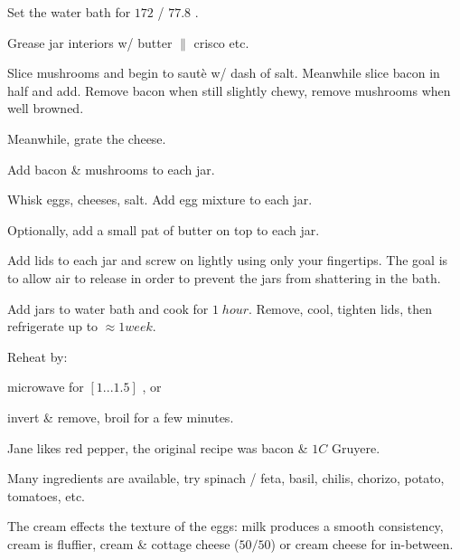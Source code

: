 \begin{preparation}
\item Set the water bath for $172$ \Fahrenheit / $77.8$ \Celsius.

\item Grease jar interiors w/ butter $\|$ crisco etc.

\item Slice mushrooms and begin to saut\`{e} w/ dash of salt. Meanwhile slice bacon in half and add.
	Remove bacon when still slightly chewy, remove mushrooms when well browned.

\item Meanwhile, grate the cheese.

\item Add bacon \& mushrooms to each jar.

\item Whisk eggs, cheeses, salt. Add egg mixture to each jar.

\item Optionally, add a small pat of butter on top to each jar.

\item Add lids to each jar and screw on lightly using only your fingertips. The goal is to allow air to release in order to prevent the jars from shattering in the bath.

\item Add jars to water bath and cook for $1\; hour$. Remove, cool, tighten lids, then refrigerate up to $\approx1 week$.

\item Reheat by:
\begin{inparaenum}
	\item microwave for $[1...1.5]$ \minute, or
	\item invert \& remove, broil for a few minutes.
\end{inparaenum}

\end{preparation}


\begin{variation}
\item Jane likes red pepper, the original recipe was bacon \& $1 C$ Gruyere.
\item Many ingredients are available, try spinach / feta, basil, chilis, chorizo, potato, tomatoes, etc.
\end{variation}


\begin{experiments}
\item The cream effects the texture of the eggs: milk produces a smooth consistency, cream is fluffier, cream \& cottage cheese ($50/50$) or cream cheese for in-between.
\end{experiments}


\recipeend

